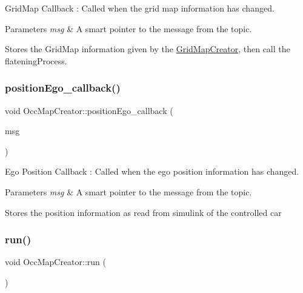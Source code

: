 Grid\+Map Callback \+: Called when the grid map information has changed. 


\begin{DoxyParams}{Parameters}
{\em msg} & A smart pointer to the message from the topic.\\
\hline
\end{DoxyParams}
Stores the Grid\+Map information given by the \hyperlink{classGridMapCreator}{Grid\+Map\+Creator}, then call the flatening\+Process. \mbox{\label{classOccMapCreator_afa7b05bd0cb89c52bafdc466203614f4}} 
\subsubsection{\texorpdfstring{position\+Ego\+\_\+callback()}{positionEgo\_callback()}}
{\footnotesize\ttfamily void Occ\+Map\+Creator\+::position\+Ego\+\_\+callback (\begin{DoxyParamCaption}\item[{const nav\+\_\+msgs\+::\+Odometry\+::\+Const\+Ptr \&}]{msg }\end{DoxyParamCaption})\hspace{0.3cm}{\ttfamily [inline]}}



Ego Position Callback \+: Called when the ego position information has changed. 


\begin{DoxyParams}{Parameters}
{\em msg} & A smart pointer to the message from the topic.\\
\hline
\end{DoxyParams}
Stores the position information as read from simulink of the controlled car \mbox{\label{classOccMapCreator_a83a46376242add139350a6d1a21f1a5f}} 
\subsubsection{\texorpdfstring{run()}{run()}}
{\footnotesize\ttfamily void Occ\+Map\+Creator\+::run (\begin{DoxyParamCaption}{ }\end{DoxyParamCaption})\hspace{0.3cm}{\ttfamily [inline]}}



